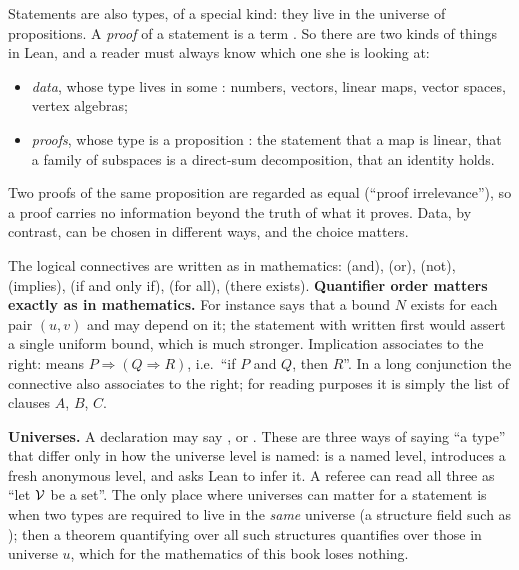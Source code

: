 Statements are also types, of a special kind: they live in the universe  of
propositions. A \emph{proof} of a statement  is a term . So there are two
kinds of things in Lean, and a reader must always know which one she is looking at:
\begin{itemize}
\item \emph{data}, whose type lives in some : numbers, vectors, linear maps, vector
  spaces, vertex algebras;
\item \emph{proofs}, whose type is a proposition : the statement that a map is
  linear, that a family of subspaces is a direct-sum decomposition, that an identity holds.
\end{itemize}
Two proofs of the same proposition are regarded as equal (``proof irrelevance''), so a proof
carries no information beyond the truth of what it proves. Data, by contrast, can be chosen in
different ways, and the choice matters.

The logical connectives are written as in mathematics:  (and),  (or),
 (not),  (implies),  (if and only if),  (for
all),  (there exists). \textbf{Quantifier order matters exactly as in mathematics.}
For instance  says that a bound $N$ exists
for each pair $(u,v)$ and may depend on it; the statement with  written first would assert
a single uniform bound, which is much stronger. Implication associates to the right:
 means $P\Rightarrow(Q\Rightarrow R)$, i.e.\ ``if $P$ and $Q$, then $R$''. In a long
conjunction  the connective also associates to the right; for reading purposes it is
simply the list of clauses $A$, $B$, $C$.


\textbf{Universes.} A declaration may say ,  or
. These are three ways of saying ``a type'' that differ only in how the universe level
is named:  is a named level,  introduces a fresh anonymous level, and \lean{_}
asks Lean to infer it. A referee can read all three as ``let $\mathcal{V}$ be a set''. The only place
where universes can matter for a statement is when two types are required to live in the
\emph{same} universe (a structure field such as ); then a theorem quantifying
over all such structures quantifies over those in universe $u$, which for the mathematics of this
book loses nothing.

